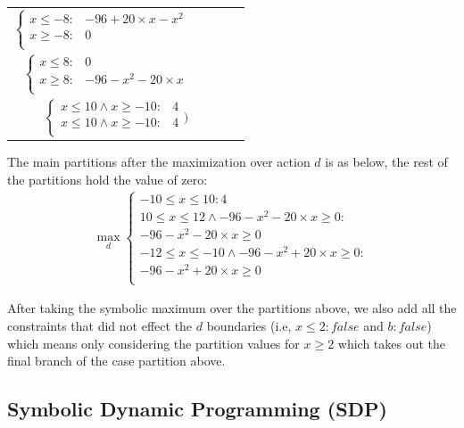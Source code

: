 \documentclass[letterpaper]{article}
\begin{document}
{\footnotesize
\begin{center}
\begin{tabular} {r c c c l}
\hspace{-4mm}
$
\begin{cases}
x \leq -8 : & -96 + 20 \times x - x^2 \\ 
x \geq -8 : & 0 \\ 
\end{cases} $

\\
\hspace{-4mm}
$ \begin{cases}
x \leq 8 : & 0 \\ 
x \geq 8: & -96 -x^2 -20\times x\\
\end{cases}$
\hspace{-4mm} 
\\
\hspace{-4mm}
$\begin{cases}
x \leq 10 \wedge x \geq -10 : & 4 \\ 
x \leq 10 \wedge x \geq -10 : & 4 \\ 
\end{cases})$
\end{tabular}
\end{center}
}

The main partitions after the maximization over action $d$ is as below, the rest of the partitions hold the value of zero: 
\begin{align*}
\max_{d}
\begin{cases}
-10 \leq x \leq 10 : 4 \\ 
10 \leq x \leq 12  \wedge  -96-x^2-20\times x \geq 0: \\ -96-x^2-20\times x \geq 0 \\ 
-12 \leq x \leq -10  \wedge  -96-x^2+20\times x \geq 0:\\ -96-x^2+20\times x \geq 0 \\
  \end{cases}
\end{align*}

After taking the symbolic maximum over the partitions above, we also add all the constraints that did not effect the $d$ boundaries (i.e, $x\leq 2:false $ and $b:false$) which means only considering the partition values for $x \geq 2$ which takes out the final branch of the case partition above. 


\subsection{Symbolic Dynamic Programming (SDP)}
\end{document}
